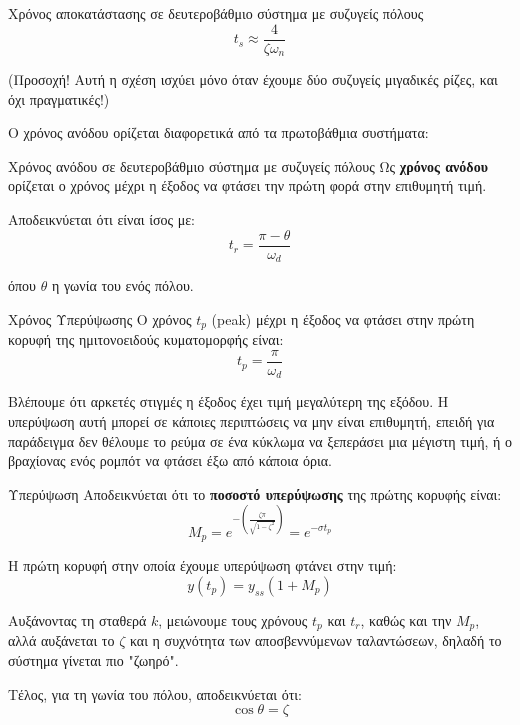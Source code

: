 \documentclass[11pt,a4paper,notitlepage,fleqn,final]{article}
\begin{document}
\begin{itemize}
	\begin{theorem}{Χρόνος αποκατάστασης σε δευτεροβάθμιο σύστημα με συζυγείς πόλους}{}
		\[
		t_s \approx \frac{4}{ζ\omega_n}
		\]
		
		({\color{red!50!black}Προσοχή!} Αυτή η σχέση ισχύει μόνο όταν έχουμε δύο συζυγείς μιγαδικές ρίζες, και όχι πραγματικές!)
	\end{theorem}
		
	Ο χρόνος ανόδου ορίζεται διαφορετικά από τα πρωτοβάθμια συστήματα:
	\begin{defn}{Χρόνος ανόδου σε δευτεροβάθμιο σύστημα με συζυγείς πόλους}{}
		Ως \textbf{χρόνος ανόδου} ορίζεται ο χρόνος μέχρι η έξοδος να φτάσει την πρώτη
		φορά στην επιθυμητή τιμή.
		
		Αποδεικνύεται ότι είναι ίσος με:
		\[
		\boxed{t_r = \frac{π-θ}{\omega_d}}
		\]
		
		όπου \( θ \) η γωνία του ενός πόλου.
	\end{defn}
	
	\begin{defn}{Χρόνος Υπερύψωσης}{}
	Ο χρόνος \( t_p \) (peak) μέχρι η έξοδος να φτάσει στην πρώτη κορυφή της ημιτονοειδούς κυματομορφής είναι:
	\[
	\boxed{t_p = \frac{π}{\omega_d}}
	\]
	\end{defn}
	
	Βλέπουμε ότι αρκετές στιγμές η έξοδος έχει τιμή μεγαλύτερη της εξόδου. Η υπερύψωση αυτή
	μπορεί σε κάποιες περιπτώσεις να μην είναι επιθυμητή, επειδή για παράδειγμα δεν θέλουμε
	το ρεύμα σε ένα κύκλωμα να ξεπεράσει μια μέγιστη τιμή, ή ο βραχίονας ενός ρομπότ να
	φτάσει έξω από κάποια όρια.
	
	\begin{defn}{Υπερύψωση}{}
		Αποδεικνύεται ότι το \textbf{ποσοστό υπερύψωσης} της πρώτης κορυφής είναι:
		\[
		M_p =
		e^{-\left(
			\frac{ζπ}{\sqrt{1-ζ^2}}
			\right)}
		= e^{-σ t_p}
		\]
		
		\tcblower
		
		Η πρώτη κορυφή στην οποία έχουμε υπερύψωση φτάνει στην τιμή:
		\[
		y\left(t_p\right) = y_{ss}(1+M_p)
		\]
	\end{defn}
	
	Αυξάνοντας τη σταθερά \( k \), μειώνουμε τους χρόνους \( t_p \) και \( t_r \), καθώς και την \( M_p \),
	αλλά αυξάνεται το \( ζ \) και η συχνότητα των αποσβεννύμενων ταλαντώσεων, δηλαδή το σύστημα γίνεται πιο "ζωηρό".
	
	Τέλος, για τη γωνία του πόλου, αποδεικνύεται ότι:
	\[
	\boxed{\cos θ = ζ}
	\]
\end{itemize}
\end{document}
